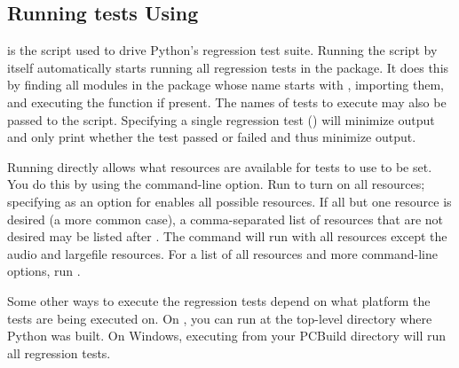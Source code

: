 \begin{seealso}
\end{seealso}



\subsection{Running tests Using  \label{regrtest}}

 is the script used to drive Python's regression test
suite.
Running the script by itself automatically starts running all
regression tests in the  package.
It does this by finding all modules in the package whose name starts with
, importing them, and executing the function 
if present.
The names of tests to execute may also be passed to the script.
Specifying a single regression test ()
will minimize output and only print whether the test passed or failed and thus
minimize output.

Running  directly allows what resources are
available for tests to use to be set.
You do this by using the  command-line option.
Run  to turn on all resources;
specifying  as an option for  enables all possible
resources.
If all but one resource is desired (a more common case), a
comma-separated list of resources that are not desired may be listed after
.
The command  will run
 with all resources except the audio and largefile
resources.
For a list of all resources and more command-line options, run
.

Some other ways to execute the regression tests depend on what platform the
tests are being executed on.
On \UNIX{}, you can run  at the top-level directory
where Python was built.
On Windows, executing  from your PCBuild directory will run all
regression tests.

